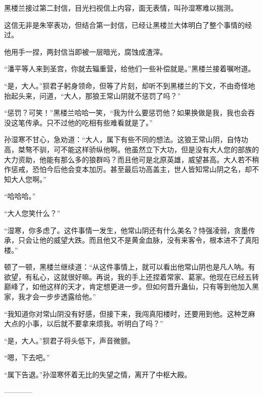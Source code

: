\begin{this_body}
黑楼兰接过第二封信，目光扫视信上内容，面无表情，叫孙湿寒难以揣测。

这信无非是朱宰表功，但结合第一封信，已经让黑楼兰大体明白了整个事情的经过。

他用手一捏，两封信当即被一层暗光，腐蚀成渣滓。

“潘平等人来到圣宫，你就去辎重营，给他们一些补偿就是。”黑楼兰接着嘱咐道。

“是，大人。”狈君子躬身领命，但等了片刻，却听不到黑楼兰的下文，不由奇怪地抬起头来，问道，“大人，那狼王常山阴就不惩罚了吗？”

“惩罚？可笑！”黑楼兰哈哈一笑，“我为什么要惩罚他？如果换做是我，我也会吞没这笔传承。只不过他的吃相有些难看就是了。”

孙湿寒不甘心，急劝道：“大人，属下有些不同的想法。这狼王常山阴，自恃功高，桀骜不驯，可不能这样骄纵他啊。他虽然立下大功，但是没有大人您的部族的大力资助，他能有那么多的狼群吗？而且他可是北原英雄，威望甚高。大人若不稍作惩戒，恐怕今后他会变本加厉。甚至最后功高盖主，世人皆知常山阴之名，却不知大人您啊。”

“哈哈哈。”

“大人您笑什么？”

“湿寒，你多虑了。这件事情一发生，他常山阴还有什么美名？恃强凌弱，贪墨传承，只会让他的威望大跌。而且他又不是黄金血脉，没有来客令，根本进不了真阳楼。”

顿了一顿，黑楼兰继续道：“从这件事情上，就可以看出他常山阴也是凡人呐。有欲望，有私心，这就很好嘛。再说，我的手上还捏着常家、葛家。他现在已经五转巅峰了，如他这样的天才，肯定想更进一步。但如何晋升蛊仙，只有等到他加入黑家，我才会一步步透露给他。”

“我知道你对常山阴没有好感，但接下来，我闯真阳楼时，还要用到他。这种芝麻大点的小事，以后就不要拿来烦我。听明白了吗？”

“是，大人。”狈君子将头低下，声音微颤。

“嗯，下去吧。”

“属下告退。”孙湿寒怀着无比的失望之情，离开了中枢大殿。

------------

\end{this_body}

